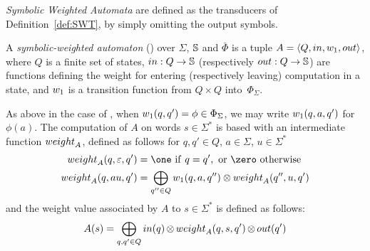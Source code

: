 \noindent
 \emph{Symbolic Weighted Automata} %
are defined  as the transducers of Definition~\ref{def:SWT},
by simply omitting the output symbols.
%
%
\begin{definition} \label{def:SWA}
A \emph{symbolic-weighted automaton} (\SWA)
over $\Sigma$, $\mathbb{S}$ and $\bar\Phi$
is a tuple
$A = \< Q, \init, {\wei_1}, \final >$,
where $Q$ is a finite set of states,
$\mathsf{in} : Q \to \Semiring$ %
(respectively $\mathsf{out} : Q \to \Semiring$)  %
are functions defining the weight for entering
(respectively leaving) computation in a state,
and ${\wei_1}$ is a transition function
from $Q \times Q$ into~$\Phi_{\Sigma}$.
\end{definition}
%
\noindent
As above in the case of \SWT,
when $\wei_1(q, q') = \phi \in \Phi_\Sigma$,
we may write $\wei_1(q, a, q')$ for~$\phi(a)$.
The computation of $A$ on words $s \in \Sigma^*$
is based with an intermediate function $\weight_A$,
defined as follows for $q, q' \in Q$, $a \in \Sigma$, $u \in \Sigma^*$
%
\begin{align}
\weight_A(q, \varepsilon, q') & = \one\ \mathrm{if}\  q = q',\ 
          \mathrm{or}\  \zero\  \mathrm{otherwise}\\
\weight_A(q, au, q') & =  \displaystyle\bigoplus_{q'' \in Q}
    \wei_{1}(q, a, q'') \otimes \weight_A(q'', u, q')\nonumber
\label{eq:SWA-weight}
\end{align}
%
\noindent
and the weight value associated by $A$ to
$s \in \Sigma^*$ is defined as follows: %
\begin{equation}
A(s)  =
\displaystyle\bigoplus_{q, q' \in Q} \init(q)
\mathop{\otimes} \weight_A(q, s, q') \mathop{\otimes} \final(q')
\label{eq:SWA-value}
\end{equation}


%

